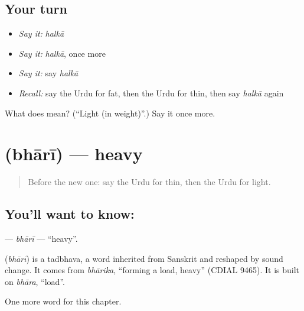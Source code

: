 \subsection*{Your turn}
\begin{itemize}
\raggedright
  \item \emph{Say it:} \emph{halkā}
  \item \emph{Say it:} \emph{halkā}, once more
  \item \emph{Say it:} say \emph{halkā}
  \item \emph{Recall:} say the Urdu for fat, then the Urdu for thin, then say \emph{halkā} again
\end{itemize}

\begin{tcolorbox}[breakable,colback=teal!4,colframe=teal!35!black,title={Before you move on}]
What does  mean? (\textquotedblleft{}Light (in weight)\textquotedblright{}.) Say it once more.
\end{tcolorbox}
\section[\texorpdfstring{\ur{بھاری} (bhārī)}{بھاری (bhārī)}]{ (bhārī) — heavy}

\label{lesson:UR-C73-bhari}



\begin{quote}
Before the new one: say the Urdu for thin, then the Urdu for light.
\end{quote}

\subsection*{You'll want to know: }
\textbf{} — \emph{bhārī} — \textquotedblleft{}heavy\textquotedblright{}.

\begin{cousinweb}
\textbf{} (\emph{bhārī}) is a tadbhava, a word inherited from Sanskrit and reshaped by sound change. It comes from \emph{bhārika}, \textquotedblleft{}forming a load, heavy\textquotedblright{} (CDIAL 9465). It is built on \emph{bhāra}, \textquotedblleft{}load\textquotedblright{}.
\end{cousinweb}

\begin{grammarlens}[title={What you've built}]
One more word for this chapter.
\end{grammarlens}

